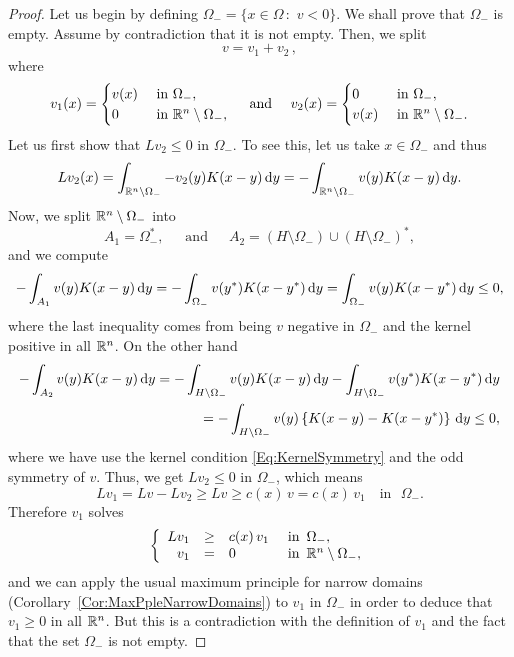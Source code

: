 \begin{proof}
	Let us begin by defining $\Omega_- = \{x\in \Omega \,:\,\, v<0\}$. We shall prove that $\Omega_-$ is empty. Assume by contradiction that it is not empty. Then, we split 
	$$ v = v_1+v_2\,, $$
	where
	\begin{equation*}
	v_1(x) = 
	\begin{cases}
	v(x)  &\textrm{ in } \Omega_-,\\
	0 &\textrm{ in } \mathbb{R}^n\setminus\Omega_-,
	\end{cases}
	\quad \text{ and } \quad
	v_2(x) = 
	\begin{cases}
	0  &\textrm{ in } \Omega_-,\\
	v(x) &\textrm{ in } \mathbb{R}^n\setminus\Omega_-.
	\end{cases}
	\end{equation*}
	Let us first show that $Lv_2\leq 0$ in $\Omega_-$. To see this, let us take $x\in\Omega_-$ and thus
	$$ 
	Lv_2(x) = \int_{\mathbb{R}^n\setminus\Omega_-} -v_2(y)K(x-y) \,\mathrm{d} y = -\int_{\mathbb{R}^n\setminus\Omega_-} v(y)K(x-y) \,\mathrm{d} y.  
	$$
	Now, we split $\mathbb{R}^n\setminus\Omega_-$ into
	$$ 
	A_1 = \Omega_-^*,\,\,\,\,\,\,\,\text{ and }\,\,\,\,\,\,\, A_2 = \left(H\setminus\Omega_-\right)\cup\left(H\setminus\Omega_-\right)^*,
	$$
	and we compute
	\begin{align*}
	-\int_{A_1} v(y)K(x-y) \,\mathrm{d} y = -\int_{\Omega_-} v(y^*)K(x-y^*) \,\mathrm{d} y  = \int_{\Omega_-} v(y)K(x-y^*) \,\mathrm{d} y \leq 0,
	\end{align*}
	where the last inequality comes from being $v$ negative in $\Omega_-$ and the kernel positive in all $\mathbb{R}^n$.
	On the other hand
	\begin{align*}
	-\int_{A_2} v(y)K(x-y) \,\mathrm{d} y = -\int_{H\setminus\Omega_-} v(y)K(x-y) \,\mathrm{d} y  -\int_{H\setminus\Omega_-} v(y^*)K(x-y^*) \,\mathrm{d} y \\ 
	= -\int_{H\setminus\Omega_-} v(y)\left\{K(x-y)-K(x-y^*)\right\} \,\mathrm{d} y \leq 0,
	\end{align*}
	where we have use the kernel condition \eqref{Eq:KernelSymmetry} and the odd symmetry of $v$. Thus, we get $Lv_2 \leq 0$ in $\Omega_-$, which means
	$$ Lv_1 = Lv-Lv_2 \geq Lv \geq c(x)\,v = c(x)\,v_1 \,\,\,\,\text{ in }\,\,\Omega_-. $$
	Therefore $v_1$ solves
	\begin{equation*}
	\left\{\begin{array}{rcll}
	Lv_1 &\geq& c(x)\,v_1   &\textrm{ in } \,\Omega_-,\\
	v_1 &=& 0 &\textrm{ in }\,\mathbb{R}^n\setminus\Omega_-,
	\end{array} \right.
	\end{equation*}
	and we can apply the usual maximum principle for narrow domains (Corollary~\ref{Cor:MaxPpleNarrowDomains}) to $v_1$ in $\Omega_-$ in order to deduce that $v_1\geq 0$ in all $\mathbb{R}^n$. But this is a contradiction with the definition of $v_1$ and the fact that the set $\Omega_-$ is not empty.
\end{proof}


